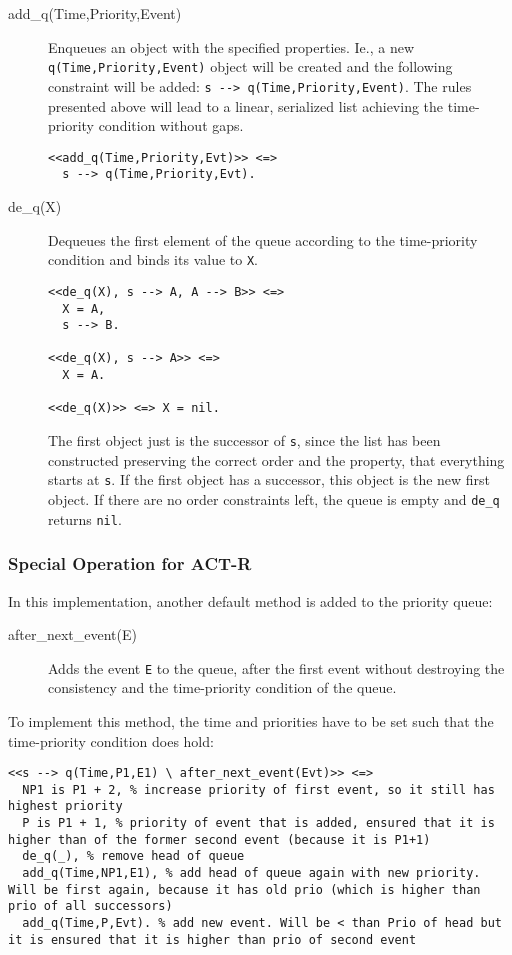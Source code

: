 \begin{description}
 \item[add\_q(Time,Priority,Event)] Enqueues an object with the specified properties. Ie., a new \lstinline|q(Time,Priority,Event)| object will be created and the following constraint will be added: \lstinline|s --> q(Time,Priority,Event)|. The rules presented above will lead to a linear, serialized list achieving the time-priority condition without gaps.
\begin{lstlisting}
<<add_q(Time,Priority,Evt)>> <=>
  s --> q(Time,Priority,Evt).
\end{lstlisting}
 \item[de\_q(X)] Dequeues the first element of the queue according to the time-priority condition and binds its value to \lstinline|X|.
\begin{lstlisting}
<<de_q(X), s --> A, A --> B>> <=>
  X = A,
  s --> B.

<<de_q(X), s --> A>> <=>
  X = A.  
  
<<de_q(X)>> <=> X = nil.
\end{lstlisting}

The first object just is the successor of \lstinline|s|, since the list has been constructed preserving the correct order and the property, that everything starts at \lstinline|s|. If the first object has a successor, this object is the new first object. If there are no order constraints left, the queue is empty and \lstinline|de_q| returns \lstinline|nil|.

\end{description}

\subsubsection{Special Operation for ACT-R}

In this implementation, another default method is added to the priority queue: 

\begin{description}
 \item[after\_next\_event(E)] Adds the event \lstinline|E| to the queue, after the first event without destroying the consistency and the time-priority condition of the queue.
\end{description}

To implement this method, the time and priorities have to be set such that the time-priority condition does hold:

\begin{lstlisting}
<<s --> q(Time,P1,E1) \ after_next_event(Evt)>> <=> 
  NP1 is P1 + 2, % increase priority of first event, so it still has highest priority
  P is P1 + 1, % priority of event that is added, ensured that it is higher than of the former second event (because it is P1+1)
  de_q(_), % remove head of queue
  add_q(Time,NP1,E1), % add head of queue again with new priority. Will be first again, because it has old prio (which is higher than prio of all successors)
  add_q(Time,P,Evt). % add new event. Will be < than Prio of head but it is ensured that it is higher than prio of second event
\end{lstlisting}

